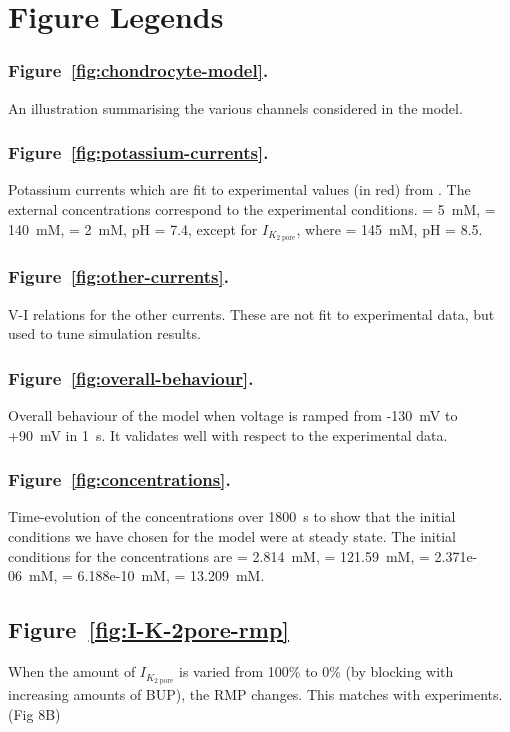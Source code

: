 \section*{Figure Legends}
\label{figures}

\subsubsection*{Figure~\ref{fig:chondrocyte-model}.}
An illustration summarising the various channels considered in the
model.

\subsubsection*{Figure~\ref{fig:potassium-currents}.}
Potassium currents which are fit to experimental values (in red) from
\cite{Clarketal2011}. The external concentrations correspond to the
experimental conditions. \Ko = 5~mM, \Nao = 140~mM, \Cao = 2~mM, pH =
7.4, except for $I_{K_{\mathrm{2\; pore}}}$, where \Ko = 145~mM, pH = 8.5.

\subsubsection*{Figure~\ref{fig:other-currents}.}
V-I relations for the other currents. These are not fit to
experimental data, but used to tune simulation results.

\subsubsection*{Figure~\ref{fig:overall-behaviour}.}
Overall behaviour of the model when voltage is ramped from -130~mV to
+90~mV in 1~s. It validates well with respect to the experimental data.

\subsubsection*{Figure~\ref{fig:concentrations}.}
Time-evolution of the concentrations over 1800~s to show that the
initial conditions we have chosen for the model were at steady
state. The initial conditions for the concentrations are \Nai =
2.814~mM, \Ki = 121.59~mM, \Cai = 2.371e-06~mM, \Hi = 6.188e-10~mM,
\Cli = 13.209~mM.

\subsection*{Figure~\ref{fig:I-K-2pore-rmp}}
When the amount of $I_{K_{\mathrm{2\; pore}}}$ is varied from 100\% to
0\% (by blocking with increasing amounts of BUP), the RMP
changes. This matches with experiments. (Fig 8B)

